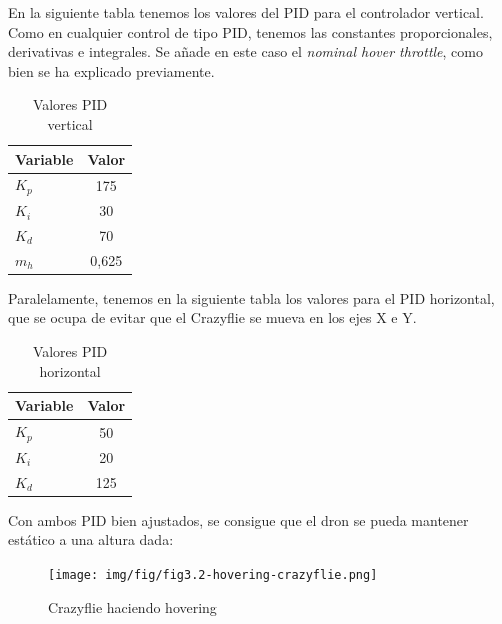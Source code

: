En la siguiente tabla tenemos los valores del PID para el controlador vertical. 
Como en cualquier control de tipo PID, tenemos las constantes proporcionales, derivativas e integrales.
Se añade en este caso el \textit{nominal hover throttle}, como bien se ha explicado previamente.

\begin{table}[h]
\centering
\begin{tabular}{l|c}
    \multicolumn{1}{c|}{\textbf{Variable}} & \textbf{Valor} \\ \hline
    $K_p$                       & 175        \\
    $K_i$                       & 30         \\
    $K_d$                       & 70         \\
    $m_h$                       & 0,625       
\end{tabular}
    \caption{Valores PID vertical}
    \label{tab:vertical_pid}
\end{table}

Paralelamente, tenemos en la siguiente tabla los valores para el PID horizontal, 
que se ocupa de evitar que el Crazyflie se mueva en los ejes X e Y.

\begin{table}[h]
\centering
\begin{tabular}{l|c}
    \multicolumn{1}{c|}{\textbf{Variable}} & \textbf{Valor} \\ \hline
    $K_p$   & 50        \\
    $K_i$   & 20        \\
    $K_d$   & 125      
\end{tabular}
    \caption{Valores PID horizontal}
    \label{tab:horizontal_pid}
\end{table}

Con ambos PID bien ajustados, se consigue que el dron se pueda mantener estático a una altura dada:

\begin{figure}[h]
    \centering
    \texttt{[image: img/fig/fig3.2-hovering-crazyflie.png]}
    \caption{Crazyflie haciendo hovering}
    \label{fig:hovering-crazyflie}
\end{figure}


